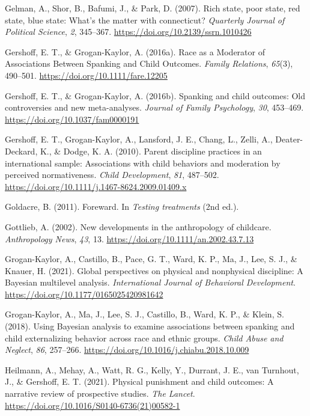 \documentclass[
  letterpaper,
  DIV=11,
  numbers=noendperiod]{scrreprt}
\newlength{\cslhangindent}
\newenvironment{CSLReferences}[2] %
 {\begin{list}{}{%
  \setlength{\itemindent}{0pt}
  \setlength{\leftmargin}{0pt}
  \setlength{\parsep}{0pt}
  \ifodd #1
   \setlength{\leftmargin}{\cslhangindent}
   \setlength{\itemindent}{-1\cslhangindent}
  \fi
  \setlength{\itemsep}{#2\baselineskip}}}
 {\end{list}}
\begin{document}
\begin{CSLReferences}{1}{0}
Gelman, A., Shor, B., Bafumi, J., \& Park, D. (2007). Rich state, poor
state, red state, blue state: What's the matter with connecticut?
\emph{Quarterly Journal of Political Science}, \emph{2}, 345--367.
\url{https://doi.org/10.2139/ssrn.1010426}

Gershoff, E. T., \& Grogan-Kaylor, A. (2016a). {Race as a Moderator of
Associations Between Spanking and Child Outcomes}. \emph{Family
Relations}, \emph{65}(3), 490--501.
\url{https://doi.org/10.1111/fare.12205}

Gershoff, E. T., \& Grogan-Kaylor, A. (2016b). Spanking and child
outcomes: Old controversies and new meta-analyses. \emph{Journal of
Family Psychology}, \emph{30}, 453--469.
\url{https://doi.org/10.1037/fam0000191}

Gershoff, E. T., Grogan-Kaylor, A., Lansford, J. E., Chang, L., Zelli,
A., Deater-Deckard, K., \& Dodge, K. A. (2010). Parent discipline
practices in an international sample: Associations with child behaviors
and moderation by perceived normativeness. \emph{Child Development},
\emph{81}, 487--502.
\url{https://doi.org/10.1111/j.1467-8624.2009.01409.x}

Goldacre, B. (2011). {Foreward}. In \emph{Testing treatments} (2nd ed.).

Gottlieb, A. (2002). New developments in the anthropology of childcare.
\emph{Anthropology News}, \emph{43}, 13.
\url{https://doi.org/10.1111/an.2002.43.7.13}

Grogan-Kaylor, A., Castillo, B., Pace, G. T., Ward, K. P., Ma, J., Lee,
S. J., \& Knauer, H. (2021). {Global perspectives on physical and
nonphysical discipline: A {B}ayesian multilevel analysis}.
\emph{International Journal of Behavioral Development}.
\url{https://doi.org/10.1177/0165025420981642}

Grogan-Kaylor, A., Ma, J., Lee, S. J., Castillo, B., Ward, K. P., \&
Klein, S. (2018). Using {B}ayesian analysis to examine associations
between spanking and child externalizing behavior across race and ethnic
groups. \emph{Child Abuse and Neglect}, \emph{86}, 257--266.
\url{https://doi.org/10.1016/j.chiabu.2018.10.009}

Heilmann, A., Mehay, A., Watt, R. G., Kelly, Y., Durrant, J. E., van
Turnhout, J., \& Gershoff, E. T. (2021). Physical punishment and child
outcomes: A narrative review of prospective studies. \emph{The Lancet}.
\url{https://doi.org/10.1016/S0140-6736(21)00582-1}


\end{CSLReferences}
\end{document}
